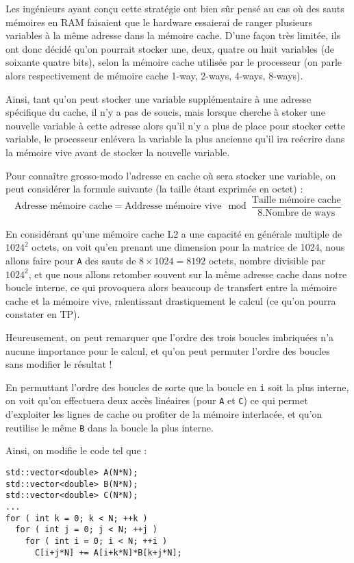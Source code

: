 \documentclass[fleqn,11pt]{article}
\begin{document}
Les ingénieurs ayant conçu cette stratégie ont bien sûr pensé au cas où des sauts mémoires en RAM faisaient que le hardware essaierai de ranger plusieurs variables à la même adresse dans la mémoire cache. D'une façon très limitée, ils ont donc décidé qu'on pourrait stocker une, deux, quatre ou huit variables (de soixante quatre bits), selon la mémoire cache utilisée par le processeur (on parle alors respectivement de mémoire cache 1-way, 2-ways, 4-ways, 8-ways).

Ainsi, tant qu'on peut stocker une variable supplémentaire à une adresse spécifique du cache, il n'y a pas de soucis, mais lorsque cherche à stoker une nouvelle variable à cette adresse alors qu'il n'y a plus de place pour stocker cette variable, le processeur enlévera la variable la plus ancienne qu'il ira reécrire dans la mémoire vive avant de stocker la nouvelle variable. 

Pour connaître grosso-modo l'adresse en cache où sera stocker une variable, on peut considérer la formule suivante (la taille étant exprimée en octet) :
\[
\textrm{Adresse mémoire cache} = \textrm{Addresse mémoire vive} \mod \frac{\textrm{Taille mémoire cache}}{8.\textrm{Nombre de ways}}
\]

En considérant qu'une mémoire cache L2 a une capacité en générale multiple de $1024^{2}$ octets, on voit
qu'en prenant une dimension pour la matrice de 1024, nous allons faire pour \texttt{A} des sauts de
$8\times 1024 = 8192$ octets, nombre divisible par $1024^{2}$, et que nous allons retomber souvent sur la
même adresse cache dans notre boucle interne, ce qui provoquera alors beaucoup de transfert entre la mémoire cache et la mémoire vive, ralentissant drastiquement le calcul (ce qu'on pourra constater en TP).

Heureusement, on peut remarquer que l'ordre des trois boucles imbriquées n'a aucune importance pour le
calcul, et qu'on peut permuter l'ordre des boucles sans modifier le résultat !

En permuttant l'ordre des boucles de sorte que la boucle en \texttt{i} soit la plus interne, on voit qu'on effectuera deux accès linéaires (pour \texttt{A} et \texttt{C}) ce qui permet d'exploiter les lignes de cache ou profiter de la mémoire interlacée, et qu'on reutilise le même \texttt{B} dans la boucle la plus interne.

Ainsi, on modifie le code tel que :

\begin{lstlisting}
std::vector<double> A(N*N);
std::vector<double> B(N*N);
std::vector<double> C(N*N);
...
for ( int k = 0; k < N; ++k )
  for ( int j = 0; j < N; ++j )
    for ( int i = 0; i < N; ++i )
      C[i+j*N] += A[i+k*N]*B[k+j*N];
\end{lstlisting}
\end{document}
